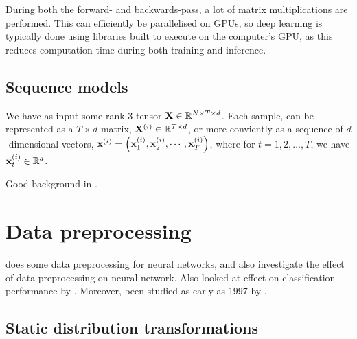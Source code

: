 \documentclass{statsmsc}
\begin{document}


During both the forward- and backwards-pass, a lot of matrix multiplications are performed.
This can efficiently be parallelised on \acp{GPU}, so deep learning is typically done using
libraries built to execute on the computer's \ac{GPU}, as this reduces computation time during both
training and inference.



\subsection{Sequence models}%
\label{sub:Sequence models}

We have as input some rank-3 tensor $\mathbf{X} \in \mathbb{R}^{N \times T \times d}$. Each sample, can be
represented as a $T \times d$ matrix, $\mathbf{X}^{(i)} \in \mathbb{R}^{T \times d}$, or more conviently
as a sequence of $d$-dimensional vectors,
$\mathbf{x}^{(i)}=\left(\mathbf{x}^{(i)}_1,\mathbf{x}^{(i)}_2,\cdots, \mathbf{x}^{(i)}_T\right)$, where
for $t=1,2,\dots,T$, we have $\mathbf{x}^{(i)}_t \in \mathbb{R}^d$.

Good background in \citep{gru}.



\section{Data preprocessing}%
\label{sec:Data preprocessing}

\cite{stanislav} does some data preprocessing for neural networks, and
\cite{nawi} also investigate the effect of data preprocessing on neural network.
Also looked at effect on classification performance by \cite{singh}.
Moreover, been studied as early as 1997 by \citep{preprocess_origin}.

\subsection{Static distribution transformations}%
\label{sub:Static distribution transformations}
\end{document}
